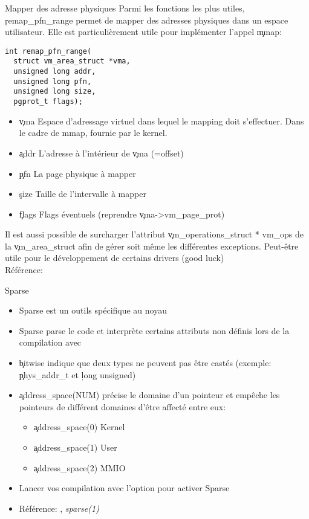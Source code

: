 \begin{frame}[fragile=singleslide]{Mapper des adresse physiques}
  Parmi les  fonctions les plus utiles,  \c{remap_pfn_range} permet de
  mapper des  adresses physiques dans un espace  utilisateur. Elle est
  particulièrement utile pour implémenter l'appel \c{mmap}:
  \begin{lstlisting} 
int remap_pfn_range(
  struct vm_area_struct *vma,
  unsigned long addr, 
  unsigned long pfn,  
  unsigned long size, 
  pgprot_t flags);    
  \end{lstlisting} 
  \begin{itemize}
  \item  \c{vma} Espace  d'adressage virtuel  dans lequel  le mapping
    doit s'effectuer. Dans le cadre de mmap, fournie par le kernel.
  \item \c{addr} L'adresse à l'intérieur de \c{vma} (=offset)
  \item \c{pfn} La page physique à mapper     
  \item \c{size} Taille de l'intervalle à mapper
  \item \c{flags} Flags éventuels (reprendre \c{vma->vm_page_prot})
  \end{itemize} 

  Il     est    aussi     possible     de    surcharger     l'attribut
  \c{vm_operations_struct *  vm_ops} de la  \c{vm_area_struct} afin de
  gérer soit même les différentes exceptions. Peut-être utile pour le
  développement de certains drivers (good luck) 
  \\[2ex]
  Référence: 
\end{frame} 

\begin{frame}[fragile=singleslide]{Sparse}
  \begin{itemize} 
  \item Sparse est un outils spécifique au noyau
  \item  Sparse parse  le code  et interprète  certains  attributs non
    définis lors de la compilation avec 
  \item \c{bitwise} indique que deux  types ne peuvent pas être castés
    (exemple: \c{phys_addr_t} et \c{long unsigned})
  \item  \c{address_space(NUM)} précise  le domaine  d'un  pointeur et
    empêche les  pointeurs de différent domaines  d'être affecté entre
    eux:
    \begin{itemize}
    \item \c{address_space(0)} Kernel
    \item \c{address_space(1)} User
    \item \c{address_space(2)} MMIO
    \end{itemize} 
  \item Lancer  vos compilation  avec l'option   pour activer
    Sparse
  \item Référence: , \emph{sparse(1)}
  \end{itemize} 
\end{frame} 

